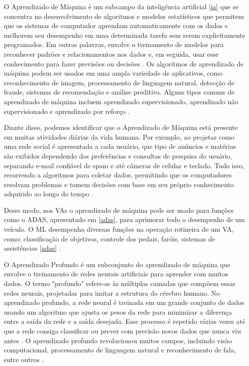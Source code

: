 O Aprendizado de Máquina é um subcampo da inteligência artificial \ref{ia} que se concentra no desenvolvimento de algoritmos e modelos estatísticos que permitem que os sistemas de computador aprendam automaticamente com os dados e melhorem seu desempenho em uma determinada tarefa sem serem explicitamente programados. Em outras palavras, envolve o treinamento de modelos para reconhecer padrões e relacionamentos nos dados e, em seguida, usar esse conhecimento para fazer previsões ou decisões \cite{review-auto}. Os algoritmos de aprendizado de máquina podem ser usados em uma ampla variedade de aplicativos, como reconhecimento de imagem, processamento de linguagem natural, detecção de fraude, sistemas de recomendação e análise preditiva. Alguns tipos comuns de aprendizado de máquina incluem aprendizado supervisionado, aprendizado não supervisionado e aprendizado por reforço \cite{software-review, software-cnn}.

Diante disso, podemos identificar que o Aprendizado de Máquina está presente em muitas atividades diárias da vida humana. Por exemplo, ao projetar como uma rede social é apresentada a cada usuário, que tipo de anúncios e matérias são exibidos dependendo das preferências e consultas de pesquisa do usuário, separando e-mail confiável de spam e até câmeras de celular e teclado. Tudo isso, recorrendo a algoritmos para coletar dados, permitindo que os computadores resolvam problemas e tomem decisões com base em seu próprio conhecimento adquirido ao longo do tempo \cite{caio}.

Desse modo, nos VAs o aprendizado de máquina pode ser usado para funções como o ADAS, apresentado em \ref{adas}, para aprimorar todo o desempenho de um veículo. O ML desempenha diversas funções na operação rotineira de um VA, como: classificação de objetivos, controle dos pedais, faróis, sistemas de assistências \ref{adas} \cite{aplicacao2}.

 \label{Profunda}

O Aprendizado Profundo é um subconjunto do aprendizado de máquina que envolve o treinamento de redes neurais artificiais para aprender com muitos dados. O termo "profundo" refere-se às múltiplas camadas que compõem essas redes neurais, projetadas para imitar a estrutura do cérebro humano. No aprendizado profundo, a rede neural é treinada em um grande conjunto de dados usando um algoritmo que ajusta os pesos da rede para minimizar a diferença entre a saída da rede e a saída desejada. Esse processo é repetido várias vezes até que a rede consiga classificar ou prever com precisão novos dados que nunca viu antes \cite{software-cnn}. O aprendizado profundo revolucionou muitos campos, incluindo visão computacional, processamento de linguagem natural e reconhecimento de fala, entre outros \cite{review-auto, software-review}. 

